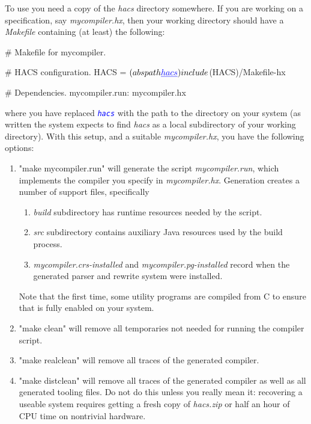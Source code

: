 \documentclass[11pt]{article} %
\begin{document}
\begin{manual}\label{man:run}\leavevmode
  To use \HAX you need a copy of the \emph{hacs} directory somewhere. If you are working on a \HAX
  specification, say \emph{mycompiler.hx}, then your working directory should have a \emph{Makefile}
  containing (at least) the following:
\begin{code}[xleftmargin=1.66em,numbers=left,commandchars=\\\{\}]
# Makefile for mycompiler.

# HACS configuration.
HACS = $(abspath \textcolor{blue}{\emph{hacs}})
include $(HACS)/Makefile-hx

# Dependencies.
mycompiler.run: mycompiler.hx
\end{code}
  where you have replaced \texttt{\textcolor{blue}{\emph{hacs}}} with the path to the \HAX directory
  on your system (as written the system expects to find \emph{hacs} as a local subdirectory of your
  working directory). With this setup, and a suitable \emph{mycompiler.hx}, you have the following
  options:
  \begin{enumerate}

  \item "make mycompiler.run" will generate the script \emph{mycompiler.run}, which implements the
    compiler you specify in \emph{mycompiler.hx}. Generation creates a number of support files,
    specifically
    \begin{enumerate}
    \item \emph{build} subdirectory has runtime resources needed by the script.
    \item \emph{src} subdirectory contains auxiliary Java resources used by the build process.
    \item \emph{mycompiler.crs-installed} and \emph{mycompiler.pg-installed} record when the
      generated parser and rewrite system were installed.
    \end{enumerate}
    Note that the first time, some utility programs are compiled from C to ensure that \HAX is fully
    enabled on your system.

  \item "make clean" will remove all temporaries not needed for running the compiler script.

  \item "make realclean" will remove all traces of the generated compiler.

  \item "make distclean" will remove all traces of the generated compiler as well as all generated
    \HAX tooling files. Do not do this unless you really mean it: recovering a useable \HAX system
    requires getting a fresh copy of \emph{hacs.zip} or half an hour of CPU time on nontrivial
    hardware.


\end{enumerate}
\end{manual}
\end{document}
